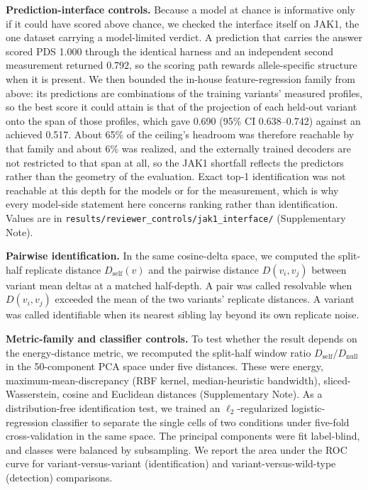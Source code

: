 \documentclass[11pt,letterpaper]{article}
\begin{document}
\textbf{Prediction-interface controls.} Because a model at chance is informative only if it could have scored above chance, we checked the interface itself on JAK1, the one dataset carrying a model-limited verdict. A prediction that carries the answer scored PDS 1.000 through the identical harness and an independent second measurement returned 0.792, so the scoring path rewards allele-specific structure when it is present. We then bounded the in-house feature-regression family from above: its predictions are combinations of the training variants' measured profiles, so the best score it could attain is that of the projection of each held-out variant onto the span of those profiles, which gave 0.690 (95\% CI 0.638--0.742) against an achieved 0.517. About 65\% of the ceiling's headroom was therefore reachable by that family and about 6\% was realized, and the externally trained decoders are not restricted to that span at all, so the JAK1 shortfall reflects the predictors rather than the geometry of the evaluation. Exact top-1 identification was not reachable at this depth for the models or for the measurement, which is why every model-side statement here concerns ranking rather than identification. Values are in \texttt{results/reviewer\_controls/jak1\_interface/} (Supplementary Note).

\textbf{Pairwise identification.} In the same cosine-delta space, we computed the split-half replicate distance $D_\mathrm{self}(v)$ and the pairwise distance $D(v_i,v_j)$ between variant mean deltas at a matched half-depth. A pair was called resolvable when $D(v_i,v_j)$ exceeded the mean of the two variants' replicate distances. A variant was called identifiable when its nearest sibling lay beyond its own replicate noise.

\textbf{Metric-family and classifier controls.} To test whether the result depends on the energy-distance metric, we recomputed the split-half window ratio $D_\mathrm{self}/D_\mathrm{null}$ in the 50-component PCA space under five distances. These were energy, maximum-mean-discrepancy (RBF kernel, median-heuristic bandwidth), sliced-Wasserstein, cosine and Euclidean distances (Supplementary Note). As a distribution-free identification test, we trained an $\ell_2$-regularized logistic-regression classifier to separate the single cells of two conditions under five-fold cross-validation in the same space. The principal components were fit label-blind, and classes were balanced by subsampling. We report the area under the ROC curve for variant-versus-variant (identification) and variant-versus-wild-type (detection) comparisons.
\end{document}
